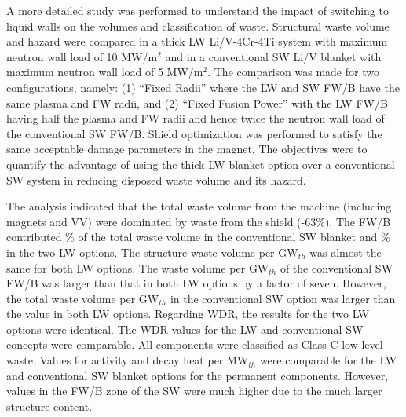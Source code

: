 A more detailed study was performed to understand the impact of switching to
liquid walls on the volumes and classification of waste.  Structural waste
volume and hazard were compared in a thick \gls{LW} Li/V-4Cr-4Ti system with
maximum neutron wall load of 10 MW/m$^2$ and in a conventional \gls{SW} Li/V
blanket with maximum neutron wall load of 5 MW/m$^2$. The comparison was made
for two configurations, namely: (1) “Fixed Radii” where the \gls{LW} and
\gls{SW} \gls{FW/B} have the same plasma and FW radii, and (2) “Fixed Fusion
Power” with the \gls{LW} \gls{FW/B} having half the plasma and \gls{FW} radii
and hence twice the neutron wall load of the conventional \gls{SW}
\gls{FW/B}. Shield optimization was performed to satisfy the same acceptable
damage parameters in the magnet. The objectives were to quantify the advantage
of using the thick \gls{LW} blanket option over a conventional \gls{SW} system
in reducing disposed waste volume and its hazard.

The analysis indicated that the total waste volume from the machine (including
magnets and \gls{VV}) were dominated by waste from the shield (-63\%). The \gls{FW/B} contributed \% of the total waste
volume in the conventional \gls{SW} blanket and \% in the two
\gls{LW} options. The structure waste volume per GW$_{th}$ was almost the same
for both \gls{LW} options. The waste volume per GW$_{th}$ of the conventional
\gls{SW} \gls{FW/B} was larger than that in both \gls{LW} options by a factor
of seven. However, the total waste volume per GW$_{th}$ in the conventional
\gls{SW} option was  larger than the value in both \gls{LW}
options. Regarding \gls{WDR}, the results for the two \gls{LW} options were
identical. The \gls{WDR} values for the \gls{LW} and conventional \gls{SW}
concepts were comparable. All components were classified as Class C low level
waste. Values for activity and decay heat per MW$_{th}$ were comparable for
the \gls{LW} and conventional \gls{SW} blanket options for the permanent
components. However, values in the \gls{FW/B} zone of the \gls{SW} were much
higher due to the much larger structure content.

